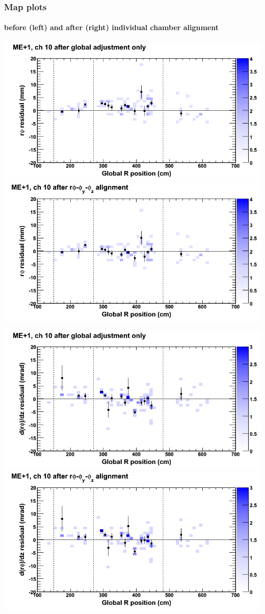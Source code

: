 \documentclass[compress]{beamer}
\begin{document}
\begin{frame}
\frametitle{Map plots}
\framesubtitle{before (left) and after (right) individual chamber alignment}
\includegraphics[width=0.5\linewidth]{ringmapplots_3dof/before_CSCvsr_mep1ch10_x.png} \includegraphics[width=0.5\linewidth]{ringmapplots_3dof/after_CSCvsr_mep1ch10_x.png}

\includegraphics[width=0.5\linewidth]{ringmapplots_3dof/before_CSCvsr_mep1ch10_dxdz.png} \includegraphics[width=0.5\linewidth]{ringmapplots_3dof/after_CSCvsr_mep1ch10_dxdz.png}
\end{frame}
\end{document}
